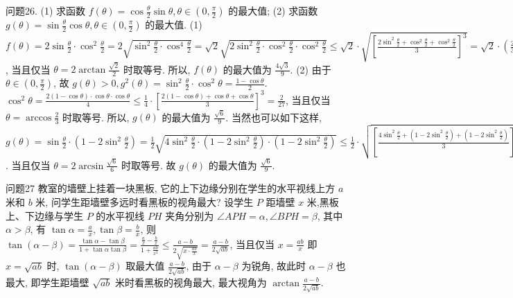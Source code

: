 问题26. (1) 求函数 $f(\theta)=\cos \frac{\theta}{2} \sin \theta, \theta \in\left(0, \frac{\pi}{2}\right)$ 的最大值;
(2) 求函数 $g(\theta)=\sin \frac{\theta}{2} \cos \theta, \theta \in\left(0, \frac{\pi}{2}\right)$ 的最大值.
(1) $f(\theta)=2 \sin \frac{\theta}{2} \cdot \cos ^2 \frac{\theta}{2}=2 \sqrt{\sin ^2 \frac{\theta}{2} \cdot \cos ^4 \frac{\theta}{2}}=\sqrt{2}\sqrt{2 \sin ^2 \frac{\theta}{2} \cdot \cos ^2 \frac{\theta}{2} \cdot \cos ^2 \frac{\theta}{2}} \leqslant \sqrt{2} \cdot \sqrt{\left[\frac{2 \sin ^2 \frac{\theta}{2}+\cos ^2 \frac{\theta}{2}+\cos ^2 \frac{\theta}{2}}{3}\right]^3}=\sqrt{2} \cdot \left(\frac{2}{3}\right)^{\frac{3}{2}}=\frac{4 \sqrt{3}}{9}$, 当且仅当 $\theta=2 \arctan \frac{\sqrt{2}}{2}$ 时取等号.
所以, $f(\theta)$ 的最大值为 $\frac{4 \sqrt{3}}{9}$.
(2) 由于 $\theta \in\left(0, \frac{\pi}{2}\right)$, 故 $g(\theta)>0, g^2(\theta)=\sin ^2 \frac{\theta}{2} \cdot \cos ^2 \theta=\frac{1-\cos \theta}{2}$. $\cos ^2 \theta=\frac{2(1-\cos \theta) \cdot \cos \theta \cdot \cos \theta}{4} \leqslant \frac{1}{4} \cdot\left[\frac{2(1-\cos \theta)+\cos \theta+\cos \theta}{3}\right]^3= \frac{2}{27}$, 当且仅当 $\theta=\arccos \frac{2}{3}$ 时取等号.
所以, $g(\theta)$ 的最大值为 $\frac{\sqrt{6}}{9}$. 当然也可以如下这样, $g(\theta)=\sin \frac{\theta}{2} \cdot\left(1-2 \sin ^2 \frac{\theta}{2}\right)=\frac{1}{2} \sqrt{4 \sin ^2 \frac{\theta}{2} \cdot\left(1-2 \sin ^2 \frac{\theta}{2}\right) \cdot\left(1-2 \sin ^2 \frac{\theta}{2}\right)} \leqslant \frac{1}{2} \cdot \sqrt{\left[\frac{4 \sin ^2 \frac{\theta}{2}+\left(1-2 \sin ^2 \frac{\theta}{2}\right)+\left(1-2 \sin ^2 \frac{\theta}{2}\right)}{3}\right]^3}=\frac{\sqrt{6}}{9}$. 当且仅当 $\theta=2 \arcsin \frac{\sqrt{6}}{6}$ 时取等号.
故 $g(\theta)$ 的最大值为 $\frac{\sqrt{6}}{9}$.



问题27 教室的墙壁上挂着一块黑板, 它的上下边缘分别在学生的水平视线上方 $a$ 米和 $b$ 米, 问学生距墙壁多远时看黑板的视角最大?
设学生 $P$ 距墙壁 $x$ 米,黑板上、下边缘与学生 $P$ 的水平视线 $P H$ 夹角分别为 $\angle A P H=\alpha, \angle B P H=\beta$, 其中 $\alpha>\beta$, 有 $\tan \alpha=\frac{a}{x}, \tan \beta=\frac{b}{x}$, 则 $\tan (\alpha-\beta)=\frac{\tan \alpha-\tan \beta}{1+\tan \alpha \tan \beta}=\frac{\frac{a}{x}-\frac{b}{x}}{1+\frac{a b}{x^2}} \leqslant \frac{a-b}{2 \sqrt{x \cdot \frac{a b}{x}}}=\frac{a-b}{2 \sqrt{a b}}$, 当且仅当 $x= \frac{a b}{x}$ 即 $x=\sqrt{a b}$ 时, $\tan (\alpha-\beta)$ 取最大值 $\frac{a-b}{2 \sqrt{a b}}$, 由于 $\alpha-\beta$ 为锐角, 故此时 $\alpha-\beta$ 也最大, 即学生距墙壁 $\sqrt{a b}$ 米时看黑板的视角最大, 最大视角为 $\arctan \frac{a-b}{2 \sqrt{a b}}$.




